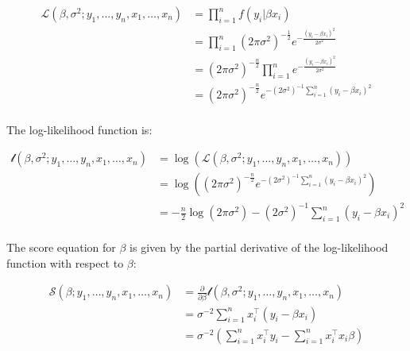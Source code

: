 \documentclass{report}
\begin{document}
\begin{equation}\label{eq:ex-ols-model-likelihood}
    \begin{aligned}
        \mathcal{L}(\beta, \sigma^2;y_1, \dots, y_n, x_1, \dots, x_n)
          &= \prod_{i=1}^n f(y_i | \beta x_i) \\
          &= \prod_{i=1}^n (2\pi\sigma^2)^{-\frac{1}{2}} e^{-\frac{(y_i - \beta x_i)^2}{2\sigma^2}} \\
          &= (2\pi\sigma^2)^{-\frac{n}{2}} \prod_{i=1}^n e^{-\frac{(y_i - \beta x_i)^2}{2\sigma^2}} \\ 
          &= (2\pi\sigma^2)^{-\frac{n}{2}} e^{-(2\sigma^2)^{-1}\sum_{i=1}^n (y_i - \beta x_i)^2} \\
    \end{aligned}
\end{equation}

The log-likelihood function is:

\begin{equation}\label{eq:ex-ols-model-loglik}
    \begin{aligned}
        \mathcal{l}(\beta, \sigma^2;y_1, \dots, y_n, x_1, \dots, x_n)
          &= \log\left(\mathcal{L}(\beta, \sigma^2;y_1, \dots, y_n, x_1, \dots, x_n)\right) \\
          &= \log\left((2\pi\sigma^2)^{-\frac{n}{2}} e^{-(2\sigma^2)^{-1}\sum_{i=1}^n (y_i - \beta x_i)^2}\right) \\
          &= -\frac{n}{2}\log\left(2\pi\sigma^2\right) - (2\sigma^2)^{-1} \sum_{i=1}^n (y_i - \beta x_i)^2 \\
    \end{aligned}
\end{equation}

The score equation for $\beta$ is given by the partial derivative of the log-likelihood function with respect to $\beta$:

\begin{equation}\label{eq:ex-ols-model-score-equation-beta}
    \begin{aligned}
        \mathcal{S}(\beta;y_1, \dots, y_n, x_1, \dots, x_n)
          &= \frac{\partial}{\partial\beta} \mathcal{l}(\beta, \sigma^2;y_1, \dots, y_n, x_1, \dots, x_n) \\
          &= \sigma^{-2} \sum_{i=1}^n x_i^\intercal (y_i - \beta x_i) \\
          &= \sigma^{-2} \left(\sum_{i=1}^n x_i^\intercal y_i - \sum_{i=1}^n x_i^\intercal x_i \beta \right) \\
    \end{aligned}
\end{equation}
\end{document}
